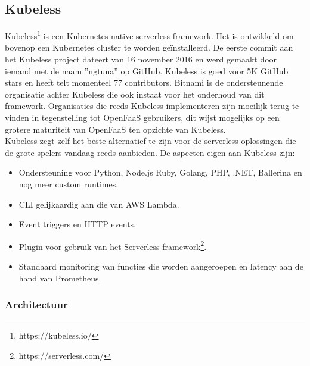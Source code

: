 \subsection{Kubeless}
Kubeless\footnote{https://kubeless.io/} is een Kubernetes native serverless framework. Het is ontwikkeld om bovenop een Kubernetes cluster te worden geïnstalleerd. De eerste commit aan het Kubeless project dateert van 16 november 2016 en werd gemaakt door iemand met de naam ''ngtuna'' op GitHub. Kubeless is goed voor 5K GitHub stars en heeft telt momenteel 77 contributors. Bitnami is de ondersteunende organisatie achter Kubeless die ook instaat voor het onderhoud van dit framework. Organisaties die reeds Kubeless implementeren zijn moeilijk terug te vinden in tegenstelling tot OpenFaaS gebruikers, dit wijst mogelijks op een grotere maturiteit van OpenFaaS ten opzichte van Kubeless. 
\\
Kubeless zegt zelf het beste alternatief te zijn voor de serverless oplossingen die de grote spelers vandaag reeds aanbieden. De aspecten eigen aan Kubeless zijn:
\begin{itemize}
    \item Ondersteuning voor Python, Node.js Ruby, Golang, PHP, .NET, Ballerina en nog meer custom runtimes.
    \item CLI gelijkaardig aan die van AWS Lambda.
    \item Event triggers en HTTP events.
    \item Plugin voor gebruik van het Serverless framework\footnote{https://serverless.com/}.
    \item Standaard monitoring van functies die worden aangeroepen en latency aan de hand van Prometheus.
\end{itemize}

\subsubsection{Architectuur}
